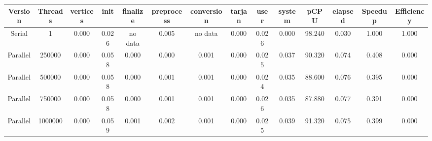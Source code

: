 \begin{tabular}{|c|c|c|c|c|c|c|c|c|c|c|c|c|c|}
\toprule
 Version &  Threads &  vertices &  init & finalize &  preprocess & conversion &  tarjan &  user &  system &   pCPU &  elapsed &  Speedup &  Efficiency \\
\midrule
  Serial &        1 &  0.000 & 0.026 &  no data &       0.005 &    no data &   0.000 & 0.026 &   0.000 & 98.240 &    0.030 &    1.000 &       1.000 \\
Parallel &   250000 &  0.000 & 0.058 &    0.000 &       0.000 &      0.001 &   0.000 & 0.025 &   0.037 & 90.320 &    0.074 &    0.408 &       0.000 \\
Parallel &   500000 &  0.000 & 0.058 &    0.000 &       0.001 &      0.001 &   0.000 & 0.024 &   0.035 & 88.600 &    0.076 &    0.395 &       0.000 \\
Parallel &   750000 &  0.000 & 0.058 &    0.000 &       0.001 &      0.001 &   0.000 & 0.026 &   0.035 & 87.880 &    0.077 &    0.391 &       0.000 \\
Parallel &  1000000 &  0.000 & 0.059 &    0.001 &       0.002 &      0.001 &   0.000 & 0.025 &   0.039 & 91.320 &    0.075 &    0.399 &       0.000 \\
\bottomrule
\end{tabular}
